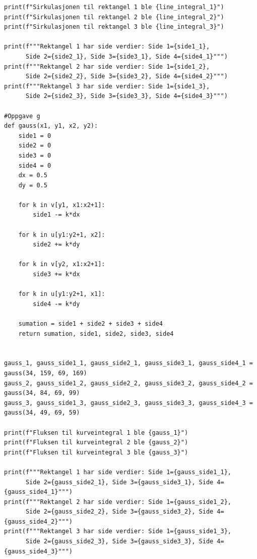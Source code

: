 \documentclass[a4paper,10pt,norsk]{article}
\begin{document}
\begin{lstlisting}
print(f"Sirkulasjonen til rektangel 1 ble {line_integral_1}")
print(f"Sirkulasjonen til rektangel 2 ble {line_integral_2}")
print(f"Sirkulasjonen til rektangel 3 ble {line_integral_3}")

print(f"""Rektangel 1 har side verdier: Side 1={side1_1},
      Side 2={side2_1}, Side 3={side3_1}, Side 4={side4_1}""")
print(f"""Rektangel 2 har side verdier: Side 1={side1_2},
      Side 2={side2_2}, Side 3={side3_2}, Side 4={side4_2}""")
print(f"""Rektangel 3 har side verdier: Side 1={side1_3},
      Side 2={side2_3}, Side 3={side3_3}, Side 4={side4_3}""")

#Oppgave g
def gauss(x1, y1, x2, y2):
    side1 = 0
    side2 = 0
    side3 = 0
    side4 = 0
    dx = 0.5
    dy = 0.5

    for k in v[y1, x1:x2+1]:
        side1 -= k*dx

    for k in u[y1:y2+1, x2]:
        side2 += k*dy

    for k in v[y2, x1:x2+1]:
        side3 += k*dx

    for k in u[y1:y2+1, x1]:
        side4 -= k*dy

    sumation = side1 + side2 + side3 + side4
    return sumation, side1, side2, side3, side4


gauss_1, gauss_side1_1, gauss_side2_1, gauss_side3_1, gauss_side4_1 = gauss(34, 159, 69, 169)
gauss_2, gauss_side1_2, gauss_side2_2, gauss_side3_2, gauss_side4_2 = gauss(34, 84, 69, 99)
gauss_3, gauss_side1_3, gauss_side2_3, gauss_side3_3, gauss_side4_3 = gauss(34, 49, 69, 59)

print(f"Fluksen til kurveintegral 1 ble {gauss_1}")
print(f"Fluksen til kurveintegral 2 ble {gauss_2}")
print(f"Fluksen til kurveintegral 3 ble {gauss_3}")

print(f"""Rektangel 1 har side verdier: Side 1={gauss_side1_1},
      Side 2={gauss_side2_1}, Side 3={gauss_side3_1}, Side 4={gauss_side4_1}""")
print(f"""Rektangel 2 har side verdier: Side 1={gauss_side1_2},
      Side 2={gauss_side2_2}, Side 3={gauss_side3_2}, Side 4={gauss_side4_2}""")
print(f"""Rektangel 3 har side verdier: Side 1={gauss_side1_3},
      Side 2={gauss_side2_3}, Side 3={gauss_side3_3}, Side 4={gauss_side4_3}""")
\end{lstlisting}
\end{document}
